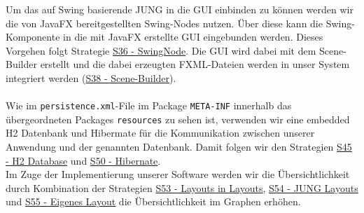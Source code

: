\documentclass[enabledeprecatedfontcommands,fontsize=11pt,paper=a4,twoside]{scrartcl}
\newcounter{one}
\begin{document}
Um das auf Swing basierende JUNG in die GUI einbinden zu können werden wir die von JavaFX bereitgestellten Swing-Nodes nutzen. Über diese kann die Swing-Komponente in die mit JavaFX erstellte GUI eingebunden werden. Dieses Vorgehen folgt Strategie \hyperlink{lll}{S36 - SwingNode}. Die GUI wird dabei mit dem Scene-Builder erstellt und die dabei erzeugten FXML-Dateien werden in unser System integriert werden (\hyperlink{mmm}{S38 - Scene-Builder}). \\ \\

Wie im \texttt{persistence.xml}-File im Package \texttt{META-INF} innerhalb das übergeordneten Packages \texttt{resources} zu sehen ist, verwenden wir eine embedded H2 Datenbank und Hibermate für die Kommunikation zwischen unserer Anwendung und der genannten Datenbank. Damit folgen wir den Strategien \hyperlink{ppp}{S45 - H2 Database} und \hyperlink{rrr}{S50 - Hibernate}. \\

Im Zuge der Implementierung unserer Software werden wir die Übersichtlichkeit durch Kombination der Strategien \hyperlink{sss}{S53 - Layouts in Layouts}, \hyperlink{xee}{S54 - JUNG Layouts} und \hyperlink{xff}{S55 - Eigenes Layout} die Übersichtlichkeit im Graphen erhöhen.
\end{document}
